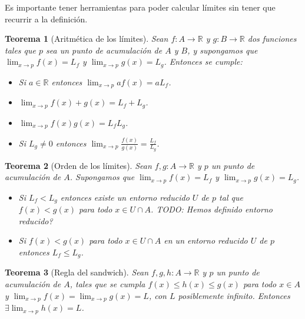 \documentclass{article}
\newtheorem{theorem}{Teorema}
\newcommand{\reales}{\mathbb{R}}
\begin{document}
Es importante tener herramientas para poder calcular límites sin tener que recurrir a la definición.

\begin{theorem}[Aritmética de los límites]
	Sean $f: A \rightarrow \reales$ y $g: B \rightarrow \reales$ dos funciones tales que $p$ sea un punto de acumulación de $A$ y $B$, y supongamos que $\lim_{x \rightarrow p} f(x) = L_f$ y $\lim_{x \rightarrow p} g(x) = L_g$. Entonces se cumple:
	\begin{itemize}
		\item
		Si $a \in \reales$ entonces $\lim_{x \rightarrow p} af(x) = aL_f$.
		\item
		$\lim_{x \rightarrow p} f(x) + g(x) = L_f + L_g$.
		\item
		$\lim_{x \rightarrow p} f(x)g(x) = L_f L_g$.
		\item
		Si $L_g \neq 0$ entonces $\lim_{x \rightarrow p} \frac{f(x)}{g(x)} = \frac{L_f}{L_g}$.
	\end{itemize}
\end{theorem}

\begin{theorem}[Orden de los límites]
	Sean $f,g: A \rightarrow \reales$ y $p$ un punto de acumulación de $A$. Supongamos que $\lim_{x\rightarrow p} f(x) = L_f$ y $\lim_{x\rightarrow p} g(x) = L_g$.
	\begin{itemize}
		\item
		Si $L_f < L_g$ entonces existe un entorno reducido $U$ de $p$ tal que $f(x) < g(x)$ para todo $x \in U \cap A$. TODO: Hemos definido entorno reducido?
		\item
		Si $f(x) < g(x)$ para todo $x \in U \cap A$ en un entorno reducido $U$ de $p$ entonces $L_f \leq L_g$.
	\end{itemize}
\end{theorem}

\begin{theorem}[Regla del sandwich]
	Sean $f,g,h: A \rightarrow \reales$ y $p$ un punto de acumulación de $A$, tales que se cumpla $f(x) \leq h(x) \leq g(x)$ para todo $x \in A$ y $\lim_{x\rightarrow p} f(x) = \lim_{x\rightarrow p} g(x) = L$, con $L$ posiblemente infinito. Entonces $\exists \lim_{x\rightarrow p} h(x) = L$.
\end{theorem}
\end{document}
